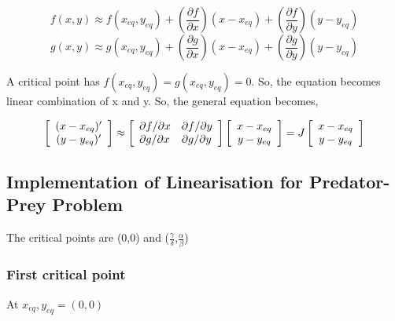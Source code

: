 \documentclass[12pt]{article}
\begin{document}
\begin{equation*}
    f ( x , y ) \approx f ( x_{eq} , y_{eq} ) + \left( \frac { \partial f } { \partial x } \right) ( x - x_{eq} ) + \left( \frac { \partial f } { \partial y } \right) ( y - y_{eq} )
\end{equation*}
\begin{equation*}
     g ( x , y ) \approx g ( x_{eq} , y_{eq} ) + \left( \frac { \partial g } { \partial x } \right) ( x - x_{eq} ) + \left( \frac { \partial g } { \partial y } \right) ( y - y_{eq} )
\end{equation*}

A critical point has $ f ( x_{eq} , y_{eq} ) = g ( x_{eq} , y_{eq} ) = 0 $. So, the equation becomes linear combination of x and y. So, the general equation becomes,

\begin{equation*}
    \left[ \begin{array} { c } ( x - x_{eq} ) ^ { \prime } \\ ( y - y_{eq} ) ^ { \prime } \end{array} \right] \approx \left[ \begin{array} { l l } \partial f / \partial x & \partial f / \partial y \\ \partial g / \partial x & \partial g / \partial y \end{array} \right] \left[ \begin{array} { c } x - x_{eq} \\ y - y_{eq} \end{array} \right] = J \left[ \begin{array} { c } x - x_{eq} \\ y - y_{eq} \end{array} \right] 
\end{equation*}

\subsection*{Implementation of Linearisation for Predator-Prey Problem}

The critical points are (0,0) and ($\frac{\gamma}{\delta}$,$\frac{\alpha}{\beta}$) \\
\subsubsection*{First critical point}
At $x_{eq}, y_{eq} = (0,0)$ \\
\end{document}
